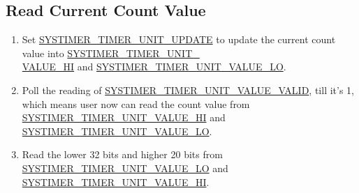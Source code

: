 \documentclass[main\_\_EN.tex]{subfiles}
\begin{document}
\subsection{Read Current Count Value}\label{sec:to-read-system-timer-value}
\begin{enumerate}
    \item Set \hyperref[fielddesc:SYSTIMERTIMERUNIT0UPDATE]{SYSTIMER\_TIMER\_UNIT\_UPDATE} to update the current count value into \hyperref[fielddesc:SYSTIMERTIMERUNIT0VALUEHI]{SYSTIMER\_TIMER\_UNIT\_\\VALUE\_HI} and \hyperref[fielddesc:SYSTIMERTIMERUNIT0VALUELO]{SYSTIMER\_TIMER\_UNIT\_VALUE\_LO}.
    \item Poll the reading of \hyperref[fielddesc:SYSTIMERTIMERUNIT0VALUEVALID]{SYSTIMER\_TIMER\_UNIT\_VALUE\_VALID}, till it's 1, which means user now can read the count value from \hyperref[fielddesc:SYSTIMERTIMERUNIT0VALUEHI]{SYSTIMER\_TIMER\_UNIT\_VALUE\_HI} and \hyperref[fielddesc:SYSTIMERTIMERUNIT0VALUELO]{SYSTIMER\_TIMER\_UNIT\_VALUE\_LO}.
    \item Read the lower 32 bits and higher 20 bits from \hyperref[fielddesc:SYSTIMERTIMERUNIT0VALUELO]{SYSTIMER\_TIMER\_UNIT\_VALUE\_LO} and \hyperref[fielddesc:SYSTIMERTIMERUNIT0VALUEHI]{SYSTIMER\_TIMER\_UNIT\_VALUE\_HI}.
\end{enumerate}
\end{document}
